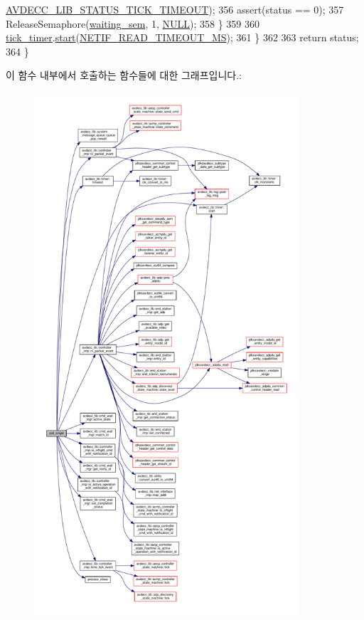 \begin{DoxyCode}
      \hyperlink{namespaceavdecc__lib_affd436edb2cecd20cfd784a84f852b2ba32ca2a87202e84d0727b3430e4cda056}{AVDECC\_LIB\_STATUS\_TICK\_TIMEOUT});
356             assert(status == 0);
357             ReleaseSemaphore(\hyperlink{classavdecc__lib_1_1system__layer2__multithreaded__callback_a48196bb38ecccc4d99ae5c5d65e8b430}{waiting\_sem}, 1, \hyperlink{openavb__types__base__pub_8h_a070d2ce7b6bb7e5c05602aa8c308d0c4}{NULL});
358         \}
359 
360         \hyperlink{classavdecc__lib_1_1system__layer2__multithreaded__callback_ad2f8d6c0a67f5c19741c8ea12eeae4d2}{tick\_timer}.\hyperlink{classavdecc__lib_1_1timer_a3ccad652c57dd233f31d40f3d39b8a01}{start}(\hyperlink{namespaceavdecc__lib_a5672955abd1a38146bde28647367857ea9f482edcc88a7e03cdc36932fb9fa8fd}{NETIF\_READ\_TIMEOUT\_MS});
361     \}
362 
363     \textcolor{keywordflow}{return} status;
364 \}
\end{DoxyCode}


이 함수 내부에서 호출하는 함수들에 대한 그래프입니다.\+:
\nopagebreak
\begin{figure}[H]
\begin{center}
\leavevmode
\includegraphics[height=550pt]{classavdecc__lib_1_1system__layer2__multithreaded__callback_aeec60d44f88ac359719331fd77ee3d14_cgraph}
\end{center}
\end{figure}




